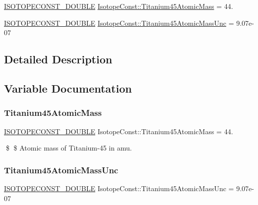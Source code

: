 \begin{DoxyCompactItemize}
\item 
\mbox{\hyperlink{group___isotope_const-_macros_ga8f45a7272ce02c0b4c65c44636ed719a}{I\+S\+O\+T\+O\+P\+E\+C\+O\+N\+S\+T\+\_\+\+D\+O\+U\+B\+LE}} \mbox{\hyperlink{group___isotope_const-_titanium-_ti45_ga4a57a1ffce876f901c755a9b66b5e0bf}{Isotope\+Const\+::\+Titanium45\+Atomic\+Mass}} = 44.
\item 
\mbox{\hyperlink{group___isotope_const-_macros_ga8f45a7272ce02c0b4c65c44636ed719a}{I\+S\+O\+T\+O\+P\+E\+C\+O\+N\+S\+T\+\_\+\+D\+O\+U\+B\+LE}} \mbox{\hyperlink{group___isotope_const-_titanium-_ti45_gaff56c04f3f10981caf31d2256acc16af}{Isotope\+Const\+::\+Titanium45\+Atomic\+Mass\+Unc}} = 9.\+07e-\/07
\end{DoxyCompactItemize}


\subsection{Detailed Description}


\subsection{Variable Documentation}
\mbox{\label{group___isotope_const-_titanium-_ti45_ga4a57a1ffce876f901c755a9b66b5e0bf}} 
\subsubsection{\texorpdfstring{Titanium45\+Atomic\+Mass}{Titanium45AtomicMass}}
{\footnotesize\ttfamily \mbox{\hyperlink{group___isotope_const-_macros_ga8f45a7272ce02c0b4c65c44636ed719a}{I\+S\+O\+T\+O\+P\+E\+C\+O\+N\+S\+T\+\_\+\+D\+O\+U\+B\+LE}} Isotope\+Const\+::\+Titanium45\+Atomic\+Mass = 44.}

\$ \$ Atomic mass of Titanium-\/45 in amu. \mbox{\label{group___isotope_const-_titanium-_ti45_gaff56c04f3f10981caf31d2256acc16af}} 
\subsubsection{\texorpdfstring{Titanium45\+Atomic\+Mass\+Unc}{Titanium45AtomicMassUnc}}
{\footnotesize\ttfamily \mbox{\hyperlink{group___isotope_const-_macros_ga8f45a7272ce02c0b4c65c44636ed719a}{I\+S\+O\+T\+O\+P\+E\+C\+O\+N\+S\+T\+\_\+\+D\+O\+U\+B\+LE}} Isotope\+Const\+::\+Titanium45\+Atomic\+Mass\+Unc = 9.\+07e-\/07}

